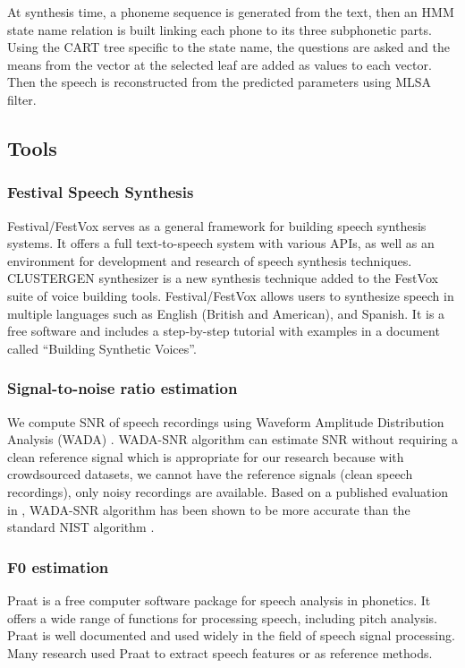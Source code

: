 \documentclass[12pt]{article}
\begin{document}
At synthesis time, a phoneme sequence is generated from the text, then an HMM state name relation is built linking each phone to its three subphonetic parts. Using the CART tree specific to the state name, the questions are asked and the means from the vector at the selected leaf are added as values to each vector. Then the speech is reconstructed from the predicted parameters using MLSA filter.

\subsection{Tools}

\subsubsection{Festival Speech Synthesis}
Festival/FestVox \cite{festvox:2014} serves as a general framework for building speech synthesis systems. It offers a full text-to-speech system with various APIs, as well as an environment for development and research of speech synthesis techniques. CLUSTERGEN synthesizer is a new synthesis technique added to the FestVox suite of voice building tools. Festival/FestVox allows users to synthesize speech in multiple languages such as English (British and American), and Spanish. It is a free software and includes a step-by-step tutorial with examples in a document called “Building Synthetic Voices”.

\subsubsection{Signal-to-noise ratio estimation}
We compute SNR of speech recordings using Waveform Amplitude Distribution Analysis (WADA) \cite{wadaSnr}. WADA-SNR algorithm can estimate SNR without requiring a clean reference signal which is appropriate for our research because with crowdsourced datasets, we cannot have the reference signals (clean speech recordings), only noisy recordings are available. Based on a published evaluation in \cite{supervisedSnr}, WADA-SNR algorithm has been shown to be more accurate than the standard NIST algorithm \cite{nistSnr}.

\subsubsection{F0 estimation}
Praat \cite{praat} is a free computer software package for speech analysis in phonetics. It offers a wide range of functions for processing speech, including pitch analysis. Praat is well documented and used widely in the field of speech signal processing. Many research used Praat to extract speech features or as reference methods.
\end{document}
